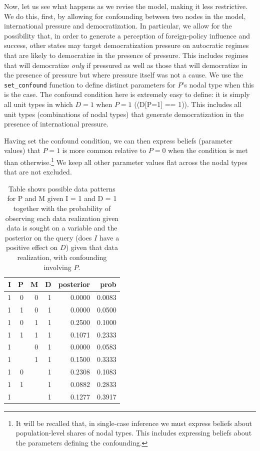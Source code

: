 \documentclass[
  12pt,
]{book}
\begin{document}
Now, let us see what happens as we revise the model, making it less restrictive. We do this, first, by allowing for confounding between two nodes in the model, international pressure and democratization. In particular, we allow for the possibility that, in order to generate a perception of foreign-policy influence and success, other states may target democratization pressure on autocratic regimes that are likely to democratize in the presence of pressure. This includes regimes that will democratize \emph{only} if pressured as well as those that will democratize in the presence of pressure but where pressure itself was not a cause. We use the \texttt{set\_confound} function to define distinct parameters for \(P\)'s nodal type when this is the case. The confound condition here is extremely easy to define: it is simply all unit types in which \(D=1\) when \(P=1\) ((D{[}P=1{]} == 1)). This includes all unit types (combinations of nodal types) that generate democratization in the presence of international pressure.

Having set the confound condition, we can then express beliefs (parameter values) that \(P=1\) is more common relative to \(P=0\) when the condition is met than otherwise.\footnote{It will be recalled that, in single-case inference we must express beliefs about population-level shares of nodal types. This includes expressing beliefs about the parameters defining the confounding.} We keep all other parameter values flat across the nodal types that are not excluded.

\begin{table}

\caption{\label{tab:possibleoutcomespimdconf}Table shows possible data patterns for P and M given I = 1 and D = 1 together with the probability of observing each data realization given data is sought on a variable and the posterior on the query (does $I$ have a positive effect on $D$) given that data realization, with confounding involving $P$.}
\centering
\begin{tabular}[t]{r|r|r|r|r|r}
\hline
I & P & M & D & posterior & prob\\
\hline
1 & 0 & 0 & 1 & 0.0000 & 0.0083\\
\hline
1 & 1 & 0 & 1 & 0.0000 & 0.0500\\
\hline
1 & 0 & 1 & 1 & 0.2500 & 0.1000\\
\hline
1 & 1 & 1 & 1 & 0.1071 & 0.2333\\
\hline
1 &  & 0 & 1 & 0.0000 & 0.0583\\
\hline
1 &  & 1 & 1 & 0.1500 & 0.3333\\
\hline
1 & 0 &  & 1 & 0.2308 & 0.1083\\
\hline
1 & 1 &  & 1 & 0.0882 & 0.2833\\
\hline
1 &  &  & 1 & 0.1277 & 0.3917\\
\hline
\end{tabular}
\end{table}
\end{document}

